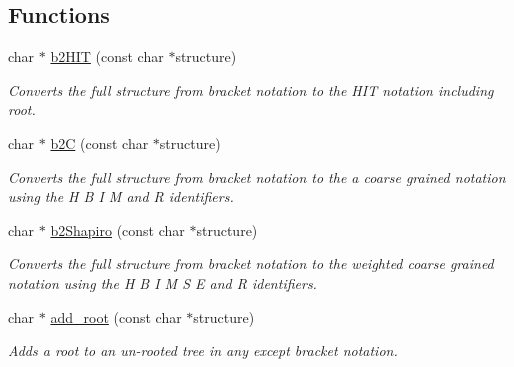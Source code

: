 \subsection*{Functions}
\begin{DoxyCompactItemize}
\item 
char $\ast$ \mbox{\hyperlink{group__struct__utils__deprecated_ga07b7e90e712559a1992fba3ac6d21bbd}{b2\+H\+IT}} (const char $\ast$structure)
\begin{DoxyCompactList}\small\item\em Converts the full structure from bracket notation to the H\+IT notation including root. \end{DoxyCompactList}\item 
char $\ast$ \mbox{\hyperlink{group__struct__utils__deprecated_ga9c80d92391f2833549a8b6dac92233f0}{b2C}} (const char $\ast$structure)
\begin{DoxyCompactList}\small\item\em Converts the full structure from bracket notation to the a coarse grained notation using the \textquotesingle{}H\textquotesingle{} \textquotesingle{}B\textquotesingle{} \textquotesingle{}I\textquotesingle{} \textquotesingle{}M\textquotesingle{} and \textquotesingle{}R\textquotesingle{} identifiers. \end{DoxyCompactList}\item 
char $\ast$ \mbox{\hyperlink{group__struct__utils__deprecated_ga5cd2feb367feeacad0c03cb7ddba5f10}{b2\+Shapiro}} (const char $\ast$structure)
\begin{DoxyCompactList}\small\item\em Converts the full structure from bracket notation to the {\itshape weighted} coarse grained notation using the \textquotesingle{}H\textquotesingle{} \textquotesingle{}B\textquotesingle{} \textquotesingle{}I\textquotesingle{} \textquotesingle{}M\textquotesingle{} \textquotesingle{}S\textquotesingle{} \textquotesingle{}E\textquotesingle{} and \textquotesingle{}R\textquotesingle{} identifiers. \end{DoxyCompactList}\item 
char $\ast$ \mbox{\hyperlink{group__struct__utils__deprecated_ga880d33066dd95441e5fbb73c57ed1c3e}{add\+\_\+root}} (const char $\ast$structure)
\begin{DoxyCompactList}\small\item\em Adds a root to an un-\/rooted tree in any except bracket notation. \end{DoxyCompactList}\item 

\end{DoxyCompactItemize}
